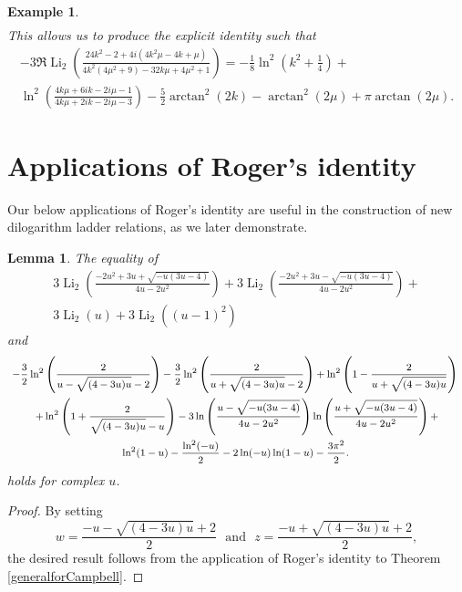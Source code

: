 \documentclass[12pt]{article}
\newtheorem{lemma}{Lemma}%
\newtheorem{example}{Example}
\begin{document}
\begin{example}
\begin{equation*}
\begin{aligned}
\end{aligned}
\end{equation*}
 This allows us to produce the explicit identity such that 
\begin{multline*}
 -3 \Re\operatorname{Li}_2 \left( \frac{24 k^2 - 
 2 + 4 i (4 k^2 \mu - 4 k + \mu)}{4 k^2 (4 \mu^2 + 9) - 32 k \mu + 4 \mu^2 + 1} \right) = 
 -\frac{1}{8} \ln^2(k^2 + \frac{1}{4}) + \\ 
 \ln^2 \left( \frac{4 k \mu + 6 i k - 2 i \mu - 1}{4 k \mu + 2 i k - 2 i \mu - 3} \right) 
- \frac{5}{2} \arctan^{2}(2 k) 
- \arctan^{2}(2 \mu) 
+ \pi \arctan(2 \mu). 
\end{multline*}
\end{example}

\section{Applications of Roger's identity}
 Our below applications of Roger's identity are useful in the construction of new dilogarithm ladder relations, as we later demonstrate. 

\begin{lemma}\label{previously10p1}
 The equality of 
\begin{multline*}
 3 \operatorname{Li}_2\left(\frac{-2u^2 + 3u + \sqrt{-u (3u - 4)}}{4u - 2u^2}\right) + 
 3 \operatorname{Li}_2\left(\frac{-2u^2 + 3u - \sqrt{-u (3u - 4)}}{4u - 2u^2}\right) + \\ 
 3 \operatorname{Li}_2(u) + 3 \operatorname{Li}_2((u - 1)^2) 
\end{multline*}
 and 
\begin{multline*}
 \text{ {\footnotesize $ - \frac{3}{2} \ln^2\left(\frac{2}{u - \sqrt{(4 - 3u) u} - 2}\right) 
 - \frac{3}{2} \ln^2\left(\frac{2}{u + \sqrt{(4 - 3u) u} - 2}\right) 
 + \ln^2\left(1 - \frac{2}{u + \sqrt{(4 - 3u) u}}\right) $ } } \\ 
 \text{ { \footnotesize $ + \ln^2\left(1 + \frac{2}{\sqrt{(4 - 3u) u} - u}\right) 
 - 3 \ln\left(\frac{u - \sqrt{-u (3u - 4)}}{4u - 2u^2}\right) 
 \ln\left(\frac{u + \sqrt{-u (3u - 4)}}{4u - 2u^2}\right) + $ } } \\ 
 \text{ { \footnotesize $ \ln^2(1 - u) - \frac{\ln^2(-u)}{2} - 2 \ln(-u) \ln(1 - u) - \frac{3 \pi^2 }{2}$. } } 
 \end{multline*}
 holds for complex $u$. 
\end{lemma}

\begin{proof}
 By setting $$w = \frac{-u - \sqrt{(4 - 3u)u} + 2}{2} \ \ \ \text{and} \ \ \ z = \frac{-u + \sqrt{(4 - 3u)u} + 2}{2}, $$ the desired result 
 follows from the application of Roger's identity to Theorem \ref{generalforCampbell}. 
\end{proof}
\end{document}
